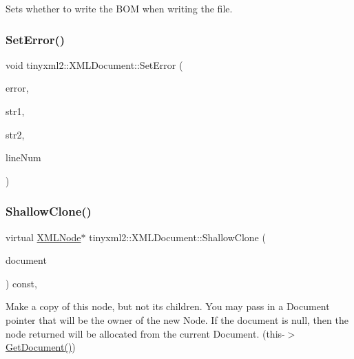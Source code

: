 Sets whether to write the B\+OM when writing the file. \mbox{\label{classtinyxml2_1_1_x_m_l_document_ab6a90fefdba2b3bb275fc06b72c7c2e6}} 
\subsubsection{\texorpdfstring{Set\+Error()}{SetError()}}
{\footnotesize\ttfamily void tinyxml2\+::\+X\+M\+L\+Document\+::\+Set\+Error (\begin{DoxyParamCaption}\item[{\hyperlink{namespacetinyxml2_a1fbf88509c3ac88c09117b1947414e08}{X\+M\+L\+Error}}]{error,  }\item[{const char $\ast$}]{str1,  }\item[{const char $\ast$}]{str2,  }\item[{int}]{line\+Num }\end{DoxyParamCaption})}

\mbox{\label{classtinyxml2_1_1_x_m_l_document_aa37cc1709d7e1e988bc17dcfb24a69b8}} 
\subsubsection{\texorpdfstring{Shallow\+Clone()}{ShallowClone()}}
{\footnotesize\ttfamily virtual \hyperlink{classtinyxml2_1_1_x_m_l_node}{X\+M\+L\+Node}$\ast$ tinyxml2\+::\+X\+M\+L\+Document\+::\+Shallow\+Clone (\begin{DoxyParamCaption}\item[{\hyperlink{classtinyxml2_1_1_x_m_l_document}{X\+M\+L\+Document} $\ast$}]{document }\end{DoxyParamCaption}) const\hspace{0.3cm}{\ttfamily [inline]}, {\ttfamily [virtual]}}

Make a copy of this node, but not its children. You may pass in a Document pointer that will be the owner of the new Node. If the \textquotesingle{}document\textquotesingle{} is null, then the node returned will be allocated from the current Document. (this-\/$>$\hyperlink{classtinyxml2_1_1_x_m_l_node_af343d1ef0b45c0020e62d784d7e67a68}{Get\+Document()})

